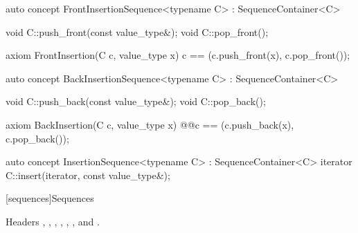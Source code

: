 \documentclass[american,twoside]{book}
\begin{document}
\begin{itemdescr}
\pnum
{} 
\end{itemdescr}

\begin{itemdecl}
auto concept FrontInsertionSequence<typename C> : SequenceContainer<C> {
  void C::push_front(const value_type&);
  void C::pop_front();

  axiom FrontInsertion(C c, value_type x) {
    c == (c.push_front(x), c.pop_front());
  }
}
\end{itemdecl}

\begin{itemdescr}
\pnum
{}
\end{itemdescr}

\begin{itemdecl}
auto concept BackInsertionSequence<typename C> : SequenceContainer<C> {
  void C::push_back(const value_type&);
  void C::pop_back();

  axiom BackInsertion(C c, value_type x) {
    @\textcolor{addclr}{}@c == (c.push_back(x), c.pop_back());
  }
}
\end{itemdecl}

\begin{itemdescr}
\pnum
{}
\end{itemdescr}

\begin{itemdecl}
auto concept InsertionSequence<typename C> : SequenceContainer<C> {
  iterator C::insert(iterator, const value_type&);
}
\end{itemdecl}

\begin{itemdescr}
\pnum
{}
\end{itemdescr}

\color{black}

[sequences]{Sequences}

\pnum
Headers , , , , , , and .
\end{document}
